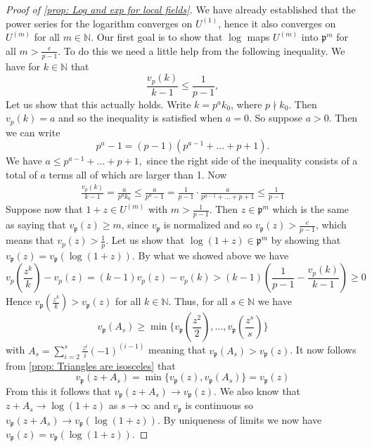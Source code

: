 \documentclass{article}
\newcommand{\mfrak}[1]{\mathfrak{#1}}
\newcommand{\mbb}[1]{\mathbb{#1}}
\newcommand{\vp}{{v_{\mfrak p}}}
\numberwithin{equation}{section}
\begin{document}
\begin{proof}[Proof of \cref{prop: Log and exp for local fields}]
    We have already established that the power series for the logarithm converges on $U^{(1)}$, hence it also converges on $U^{(m)}$ for all $m \in \mbb N$. Our first goal is to show that $\log$ maps $U^{(m)}$ into $\mfrak p^{m}$ for all $m > \frac{e}{p-1}$. To do this we need a little help from the following inequality. We have for $k \in \mbb N$ that
    $$\frac{v_p(k)}{k-1} \leq \frac{1}{p-1},$$
    Let us show that this actually holds. Write $k = p^ak_0$, where $p \nmid k_0$. Then $v_p(k) = a$ and so the inequality is satisfied when $a = 0$. So suppose $a > 0$. Then we can write
    $$p^a - 1 = (p-1)(p^{a-1} + ... + p + 1).$$
    We have
    $a \leq p^{a-1} + ... + p + 1,$
    since the right side of the inequality consists of a total of $a$ terms all of which are larger than 1. Now
    \begin{align*}
        \frac{v_p(k)}{k-1} = \frac{a}{p^ak_0} \leq \frac{a}{p^a - 1} = \frac{1}{p-1}\cdot \frac{a}{p^{a-1} + ... + p + 1} \leq \frac{1}{p-1}
    \end{align*}
    Suppose now that $1+z \in U^{(m)}$ with $m > \frac{1}{p-1}$. Then $z \in \mfrak p^m$ which is the same as saying that $\vp (z) \geq m$, since $\vp$ is normalized and so $\vp(z) > \frac{e}{p-1}$, which means that $v_p(z) > \frac{1}{p}$. Let us show that $\log(1+z) \in \mfrak p^m$ by showing that $\vp(z) = \vp(\log(1+ z))$. By what we showed above we have
    $$v_p(\frac{z^k}{k}) - v_p(z) = (k-1)v_p(z) - v_p(k) > (k-1)(\frac{1}{p-1} - \frac{v_p(k)}{k-1}) \geq 0$$
    Hence $\vp(\frac{z^k}{k}) > \vp(z)$ for all $k \in \mbb N$. Thus, for all $s \in \mbb N$ we have $$\vp(A_s) \geq \min \{\vp(\frac{z^2}{2}), ..., \vp(\frac{z^s}{s}) \}$$
    with $A_s = \sum_{i = 2}^s \frac{z^i}{i} (-1)^{(i-1)}$ meaning that $\vp(A_s) > \vp(z)$. It now follows from \cref{prop: Triangles are isosceles} that
    $$\vp(z + A_s) = \min\{\vp(z), \vp(A_s)\} = \vp(z)$$
    From this it follows that $\vp(z + A_s) \to \vp(z)$. We also know that $z + A_s \to \log(1 + z)$ as $s \to \infty$ and $\vp$ is continuous so $\vp(z + A_s) \to \vp(\log(1 + z))$. By uniqueness of limits we now have $\vp(z) = \vp(\log(1+z))$.


\end{proof}
\end{document}
